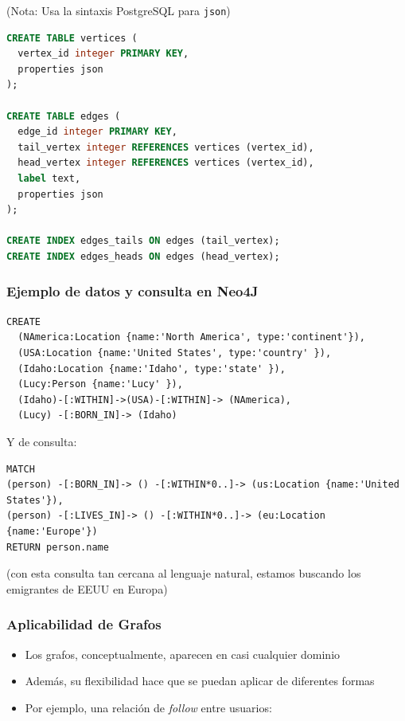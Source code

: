 \documentclass[14pt]{beamer}
\begin{document}
\begin{frame}
\begin{itemize}
\begin{frame}
(Nota: Usa la sintaxis PostgreSQL para {\tt json})
\begin{lstlisting}[language=SQL]
CREATE TABLE vertices (
  vertex_id integer PRIMARY KEY,
  properties json
);

CREATE TABLE edges (
  edge_id integer PRIMARY KEY,
  tail_vertex integer REFERENCES vertices (vertex_id),
  head_vertex integer REFERENCES vertices (vertex_id),
  label text,
  properties json
);

CREATE INDEX edges_tails ON edges (tail_vertex);
CREATE INDEX edges_heads ON edges (head_vertex);
\end{lstlisting}
\end{frame}

\begin{frame}
  \frametitle{Ejemplo de datos y consulta en Neo4J}
\begin{block}{}
\begin{lstlisting}
CREATE
  (NAmerica:Location {name:'North America', type:'continent'}),
  (USA:Location {name:'United States', type:'country' }),
  (Idaho:Location {name:'Idaho', type:'state' }),
  (Lucy:Person {name:'Lucy' }),
  (Idaho)-[:WITHIN]->(USA)-[:WITHIN]-> (NAmerica),
  (Lucy) -[:BORN_IN]-> (Idaho)
\end{lstlisting}
\end{block}

\framebreak

Y de consulta:
\begin{block}{}
\begin{lstlisting}
MATCH
(person) -[:BORN_IN]-> () -[:WITHIN*0..]-> (us:Location {name:'United States'}),
(person) -[:LIVES_IN]-> () -[:WITHIN*0..]-> (eu:Location {name:'Europe'})
RETURN person.name
\end{lstlisting}
\end{block}

(con esta consulta tan cercana al lenguaje natural, estamos buscando los
emigrantes de EEUU en Europa)

\end{frame}


\begin{frame}[allowframebreaks]
  \frametitle{Aplicabilidad de Grafos}
  \begin{itemize}
  \item Los grafos, conceptualmente, aparecen en casi cualquier dominio
  \item Además, su flexibilidad hace que se puedan aplicar de diferentes
    formas
  \item Por ejemplo, una relación de {\em follow\/} entre usuarios:


\end{itemize}
\end{frame}
\end{itemize}
\end{frame}
\end{document}
